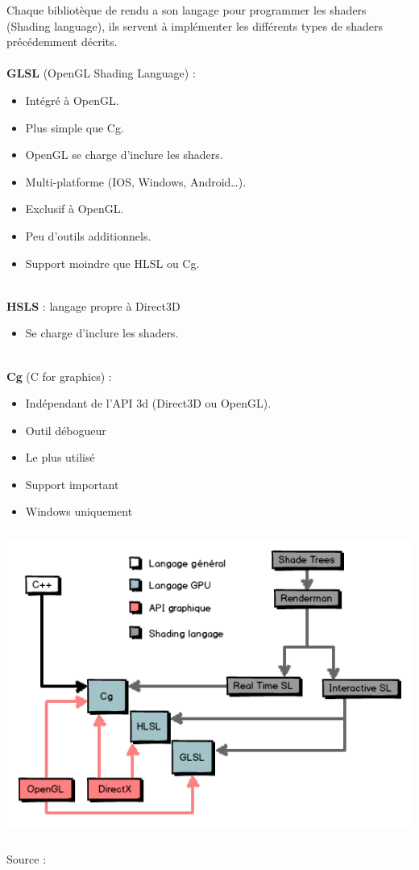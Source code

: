 Chaque bibliotèque de rendu a son langage pour programmer les shaders (Shading language), ils servent à implémenter les différents types de shaders précédemment décrits.\\
\textbf{\\GLSL} (OpenGL Shading Language) : 
\begin{itemize}
	\item Intégré à OpenGL.
	\item Plus simple que Cg.
	\item OpenGL se charge d’inclure les shaders.
	\item Multi-platforme (IOS, Windows, Android…).
	\item Exclusif à OpenGL.
	\item Peu d’outils additionnels.
	\item Support moindre que HLSL ou Cg.
\end{itemize}
\textbf{\\HSLS} : langage propre à Direct3D
\begin{itemize}
	\item Se charge d’inclure les shaders.
\end{itemize}
\textbf{\\Cg} (C for graphics) : 
\begin{itemize}
	\item Indépendant de l’API 3d (Direct3D ou OpenGL).
	\item Outil débogueur
	\item Le plus utilisé
	\item Support important
	\item Windows uniquement
\end{itemize}
\begin{center}
\includegraphics[width=14cm,height=100mm]{pipeline/images/langages.png}
\end{center}

Source : \cite{shader2}